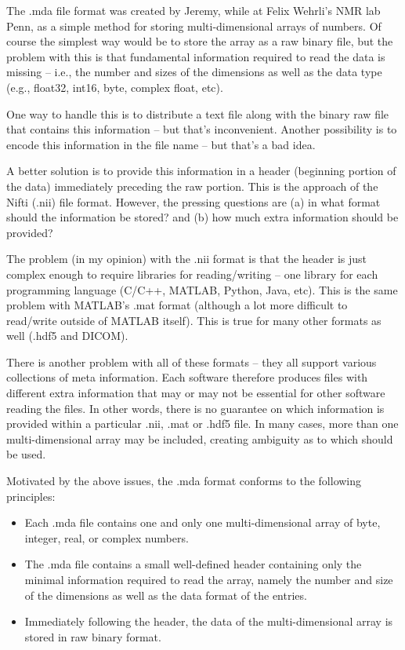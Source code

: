 \documentclass{article}
\begin{document}
The .mda file format was created by Jeremy, while at Felix Wehrli's NMR lab Penn, as a simple method for storing multi-dimensional arrays of numbers. Of course the simplest way would be to store the array as a raw binary file, but the problem with this is that fundamental information required to read the data is missing – i.e., the number and sizes of the dimensions as well as the data type (e.g., float32, int16, byte, complex float, etc).

One way to handle this is to distribute a text file along with the binary raw file that contains this information – but that's inconvenient. Another possibility is to encode this information in the file name – but that's a bad idea.

A better solution is to provide this information in a header (beginning portion of the data) immediately preceding the raw portion. This is the approach of the Nifti (.nii) file format. However, the pressing questions are (a) in what format should the information be stored? and (b) how much extra information should be provided?

The problem (in my opinion) with the .nii format is that the header is just complex enough to require libraries for reading/writing – one library for each programming language (C/C++, MATLAB, Python, Java, etc). This is the same problem with MATLAB's .mat format (although a lot more difficult to read/write outside of MATLAB itself). This is true for many other formats as well (.hdf5 and DICOM).

There is another problem with all of these formats – they all support various collections of meta information. Each software therefore produces files with different extra information that may or may not be essential for other software reading the files. In other words, there is no guarantee on which information is provided within a particular .nii, .mat or .hdf5 file. In many cases, more than one multi-dimensional array may be included, creating ambiguity as to which should be used.

Motivated by the above issues, the .mda format conforms to the following principles:
\begin{itemize}
\item{Each .mda file contains one and only one multi-dimensional array of byte, integer, real, or complex numbers.}
\item{The .mda file contains a small well-defined header containing only the minimal information required to read the array, namely the number and size of the dimensions as well as the data format of the entries.}
\item{Immediately following the header, the data of the multi-dimensional array is stored in raw binary format.}
\end{itemize}
\end{document}
